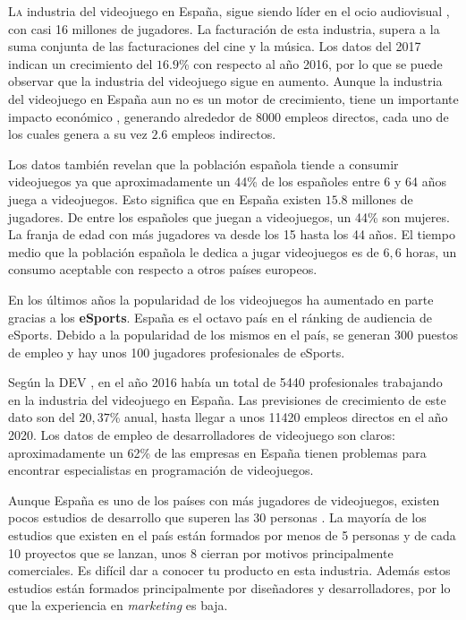 \lettrine[lines=2,findent=2pt,nindent=3pt,loversize=0.1]{\textcolor[gray]{0.4}{L}}{a} industria del videojuego en España, sigue siendo líder en el ocio audiovisual \cite{1}, con casi 16 millones de jugadores. La facturación de esta industria, supera a la suma conjunta de las facturaciones del cine y la música. Los datos del 2017 indican un crecimiento del $16.9$\% con respecto al año 2016, por lo que se puede observar que la industria del videojuego sigue en aumento. Aunque la industria del videojuego en España aun no es un motor de crecimiento, tiene un importante impacto económico \cite{2}, generando alrededor de 8000 empleos directos, cada uno de los cuales genera a su vez $2.6$ empleos indirectos.

Los datos también revelan que la población española tiende a consumir videojuegos ya que aproximadamente un 44\% de los españoles entre 6 y 64 años juega a videojuegos. Esto significa que en España existen $15.8$ millones de jugadores. De entre los españoles que juegan a videojuegos, un 44\% son mujeres. La franja de edad con más jugadores va desde los 15 hasta los 44 años. El tiempo medio que la población española le dedica a jugar videojuegos es de $6,6$ horas, un consumo aceptable con respecto a otros países europeos.

En los últimos años la popularidad de los videojuegos ha aumentado en parte gracias a los \textbf{eSports}. España es el octavo país en el ránking de audiencia de eSports. Debido a la popularidad de los mismos en el país, se generan 300 puestos de empleo y hay unos 100 jugadores profesionales de eSports.

Según la \acf{DEV} \cite{3}, en el año 2016 había un total de 5440 profesionales trabajando en la industria del videojuego en España. Las previsiones de crecimiento de este dato son del $20,37$\% anual, hasta llegar a unos 11420 empleos directos en el año 2020. Los datos de empleo de desarrolladores de videojuego son claros: aproximadamente un 62\% de las empresas en España tienen problemas para encontrar especialistas en programación de videojuegos. 

Aunque España es uno de los países con más jugadores de videojuegos, existen pocos estudios de desarrollo que superen las 30 personas \cite{4}. La mayoría de los estudios que existen en el país están formados por menos de 5 personas y de cada 10 proyectos que se lanzan, unos 8 cierran por motivos principalmente comerciales. Es difícil dar a conocer tu producto en esta industria. Además estos estudios están formados principalmente por diseñadores y desarrolladores, por lo que la experiencia en \textit{marketing} es baja.

